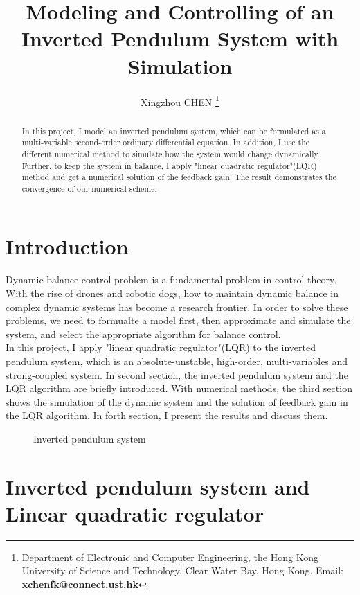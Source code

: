 \documentclass[a4paper,11pt]{article}
\title{Modeling and Controlling of an Inverted Pendulum System with Simulation}
\author{
Xingzhou CHEN \thanks{Department of Electronic and Computer Engineering, the Hong Kong University of Science and Technology, Clear Water Bay, Hong Kong. Email: {\bf xchenfk@connect.ust.hk}}  
}
\begin{document}
\thispagestyle{plain}
\maketitle

\begin{abstract}
In this project, I model an inverted pendulum system, which can be formulated as a multi-variable second-order ordinary differential equation. 
In addition, I use the different numerical method to simulate how the system would change dynamically. Further, to keep the system in balance,
I apply "linear quadratic regulator"(LQR) method and get a numerical solution of the feedback gain. The result demonstrates the convergence of
our numerical scheme.

\end{abstract}

\section{Introduction}
Dynamic balance control problem is a fundamental problem in control theory. With the rise of drones and robotic dogs, how to maintain dynamic balance 
in complex dynamic systems has become a research frontier. In order to solve these problems, we need to formualte a model first, then approximate 
and simulate the system, and select the appropriate algorithm for balance control. \\
In this project, I apply "linear quadratic regulator"(LQR) to 
the inverted pendulum system, which is an absolute-unstable, high-order, multi-variables and strong-coupled system. In second section, the inverted pendulum 
system and the LQR algorithm are briefly introduced. With numerical methods, the third section shows the simulation of the dynamic system and the solution of 
feedback gain in the LQR algorithm. In forth section, I present the results and discuss them.
\begin{figure}[!htb]
	\centerline{
	}
	\caption{Inverted pendulum system}
	\label{Figure:Cart with inverted pendulum}
\end{figure}

\section{Inverted pendulum system and Linear quadratic regulator}
\end{document}
